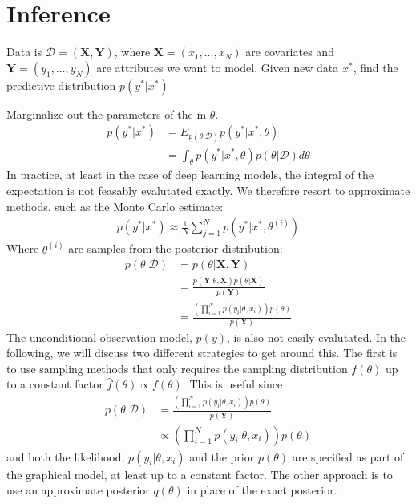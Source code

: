 \chapter{Inference}

Data is $\mathcal{D} = (\bm{X}, \bm{Y})$, where $\bm{X} = (x_1,\dots,x_N)$ are covariates and $\bm{Y} = (y_1, \dots, y_N)$ are attributes we want to model.
Given new data $x^\ast$, find the predictive distribution $p(y^\ast | x^\ast)$ 


Marginalize out the parameters of the m $\theta$.
\begin{align*}
    p(y^\ast | x^\ast) &= E_{p(\theta|\mathcal{D})} p(y^\ast | x^\ast, \theta) \\
                       &= \int_{\theta} p(y^\ast | x^\ast, \theta)  p(\theta|\mathcal{D}) d\theta
\end{align*}
In practice, at least in the case of deep learning models, the integral of the expectation is not feasably evalutated exactly. 
We therefore resort to approximate methods, such as the Monte Carlo estimate:
\begin{align*}
    p(y^\ast | x^\ast)  \approx \frac{1}{N} \sum_{j=1}^N p(y^\ast | x^\ast, \theta^{(i)}) 
\end{align*}
Where $\theta^{(i)}$ are samples from the posterior distribution:
\begin{align*}
    p(\theta | \mathcal{D}) 
    &= p(\theta | \bm{X}, \bm{Y}) \\
    &= \frac{p(\bm{Y} |\theta, \bm{X}) p(\theta|\bm{X})}{p(\bm{Y}) } \\
    &= \frac
    {\left(\prod_{i=1}^N p(y_i |\theta, x_i)\right) p(\theta)}
    {p(\bm{Y}) }  
\end{align*}
The unconditional  observation model, $p(y)$, is also not easily evalutated. 
In the following, we will discuss two different strategies to get around this. 
The first is to use sampling methods that only requires the sampling distribution $f(\theta)$ up to a constant factor $\hat{f}(\theta)\propto f(\theta)$. 
This is useful since 
\begin{align*}
    p(\theta | \mathcal{D}) 
    &= \frac
    {\left(\prod_{i=1}^N p(y_i |\theta, x_i)\right) p(\theta)}
    {p(\bm{Y}) }  \\
    &\propto \left(\prod_{i=1}^N p(y_i |\theta, x_i)\right) p(\theta)
\end{align*}
and both the likelihood, $p(y_i |\theta, x_i)$ and the prior $p(\theta)$ are specified as part of the graphical model, at least up to a constant factor. 
The other approach is to use an approximate posterior $q(\theta)$ in place of the exact posterior. 

